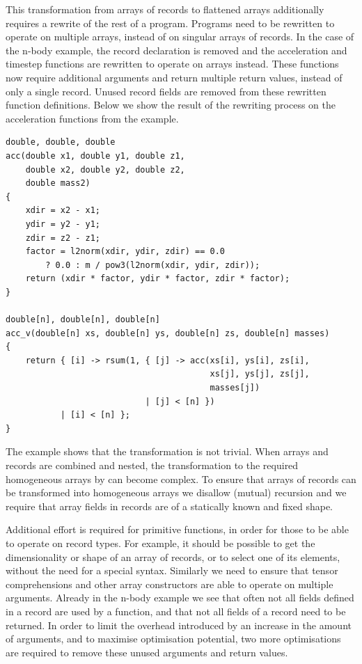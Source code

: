 This transformation from arrays of records to flattened arrays additionally requires a rewrite of the rest of a program.
Programs need to be rewritten to operate on multiple arrays, instead of on singular arrays of records.
In the case of the n-body example, the record declaration is removed and the acceleration and timestep functions are rewritten to operate on arrays instead.
These functions now require additional arguments and return multiple return values, instead of only a single record.
Unused record fields are removed from these rewritten function definitions. 
Below we show the result of the rewriting process on the acceleration functions from the example.
%
\begin{lstlisting}
double, double, double
acc(double x1, double y1, double z1,
    double x2, double y2, double z2,
    double mass2)
{
    xdir = x2 - x1;
    ydir = y2 - y1;
    zdir = z2 - z1;
    factor = l2norm(xdir, ydir, zdir) == 0.0
        ? 0.0 : m / pow3(l2norm(xdir, ydir, zdir));
    return (xdir * factor, ydir * factor, zdir * factor);
}

double[n], double[n], double[n]
acc_v(double[n] xs, double[n] ys, double[n] zs, double[n] masses)
{
    return { [i] -> rsum(1, { [j] -> acc(xs[i], ys[i], zs[i],
                                         xs[j], ys[j], zs[j],
                                         masses[j])
                            | [j] < [n] })
           | [i] < [n] };
}
\end{lstlisting}
%
The example shows that the transformation is not trivial. 
When arrays and records are combined and nested, the transformation to the required homogeneous arrays by \sac{} can become complex.
To ensure that arrays of records can be transformed into homogeneous arrays we disallow (mutual) recursion and we require that array fields in records are of a statically known and fixed shape.

Additional effort is required for primitive functions, in order for those to be able to operate on record types.
For example, it should be possible to get the dimensionality or shape of an array of records, or to select one of its elements, without the need for a special syntax.
Similarly we need to ensure that tensor comprehensions and other array constructors are able to operate on multiple arguments.
Already in the n-body example we see that often not all fields defined in a record are used by a function, and that not all fields of a record need to be returned.
In order to limit the overhead introduced by an increase in the amount of arguments, and to maximise optimisation potential, two more optimisations are required to remove these unused arguments and return values.



